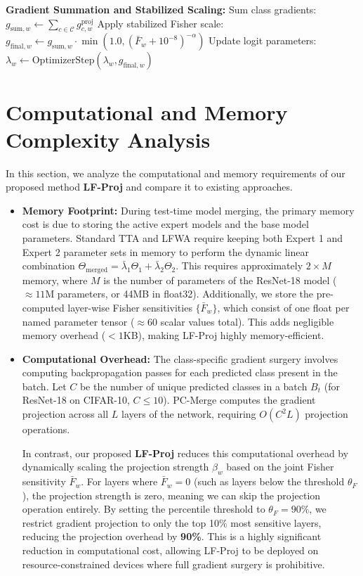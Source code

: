 \documentclass{article}
\theoremstyle{plain}
\theoremstyle{definition}
\theoremstyle{remark}
\begin{document}
\begin{algorithm}[h]
\begin{algorithmic}[1]
    \STATE \textbf{Gradient Summation and Stabilized Scaling:}
    \STATE Sum class gradients: $g_{\text{sum}, w} \leftarrow \sum_{c \in \mathcal{C}} g^{\text{proj}}_{c, w}$
    \STATE Apply stabilized Fisher scale: $g_{\text{final}, w} \leftarrow g_{\text{sum}, w} \cdot \min\left(1.0, (\bar{F}_w + 10^{-8})^{-\alpha}\right)$
    \STATE Update logit parameters: $\lambda_w \leftarrow \text{OptimizerStep}(\lambda_w, g_{\text{final}, w})$
\ENDFOR
\end{algorithmic}
\end{algorithm}

\section{Computational and Memory Complexity Analysis}
In this section, we analyze the computational and memory requirements of our proposed method \textbf{LF-Proj} and compare it to existing approaches.
\begin{itemize}
    \item \textbf{Memory Footprint:} During test-time model merging, the primary memory cost is due to storing the active expert models and the base model parameters. Standard TTA and LFWA require keeping both Expert 1 and Expert 2 parameter sets in memory to perform the dynamic linear combination $\Theta_{\text{merged}} = \bar{\lambda}_1 \Theta_1 + \bar{\lambda}_2 \Theta_2$. This requires approximately $2 \times M$ memory, where $M$ is the number of parameters of the ResNet-18 model ($\approx 11$M parameters, or 44MB in float32). Additionally, we store the pre-computed layer-wise Fisher sensitivities $\{\bar{F}_w\}$, which consist of one float per named parameter tensor ($\approx 60$ scalar values total). This adds negligible memory overhead ($< 1$KB), making LF-Proj highly memory-efficient.
    \item \textbf{Computational Overhead:} The class-specific gradient surgery involves computing backpropagation passes for each predicted class present in the batch. Let $C$ be the number of unique predicted classes in a batch $B_t$ (for ResNet-18 on CIFAR-10, $C \le 10$). PC-Merge computes the gradient projection across all $L$ layers of the network, requiring $O(C^2 L)$ projection operations. 
    
    In contrast, our proposed \textbf{LF-Proj} reduces this computational overhead by dynamically scaling the projection strength $\beta_w$ based on the joint Fisher sensitivity $\bar{F}_w$. For layers where $\bar{F}_w = 0$ (such as layers below the threshold $\theta_F$), the projection strength is zero, meaning we can skip the projection operation entirely. By setting the percentile threshold to $\theta_F = 90\%$, we restrict gradient projection to only the top 10\% most sensitive layers, reducing the projection overhead by \textbf{90\%}. This is a highly significant reduction in computational cost, allowing LF-Proj to be deployed on resource-constrained devices where full gradient surgery is prohibitive.
\end{itemize}
\end{document}
